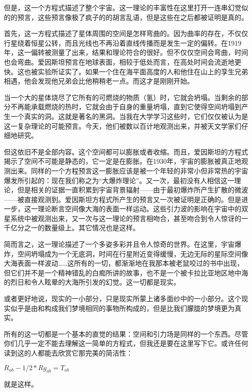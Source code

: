    但是，这一个方程式描述了整个宇宙。这一理论的丰富性在这里打开一连串幻觉似的的预言，这些预言像极了疯子的的胡言乱语，但是这些在之后都被证明是真的。

   首先，这一方程式描述了星体周围的空间是怎样弯曲的。因为曲率的存在，不仅仅行星绕着恒星公转，而且光线也不再沿着直线传播而是发生一定的偏转。在1919年，这一偏转被测量了出来，结果和理论符合的很好。但不仅仅空间会弯曲，时间也会弯曲。爱因斯坦预言在地球表面，相较于低处而言，在高处时间会流逝地更快。这也被实验所证实了。如果一个住在海平面高度的人和他住在山上的孪生兄弟相遇，他会发现他兄弟会比他稍稍老一点。而这才是刚刚开始。

   当一个大的星体烧尽了它所有的可燃烧的物质（氢）时，它就会坍塌。当剩余的部分不再能承载燃烧的热时，它就会由于自身的重量坍塌，直到它使得空间坍塌到产生一个真实的洞。这就是著名的黑洞。当我在大学学习这些时，它们仅仅被认为是这一复杂理论的可能预言。今天，他们被数以百计地观测出来，并被天文学家们仔细地研究。

   但这依旧不是全部内容。这个空间都可以膨胀或者收缩。而且，爱因斯坦的方程式揭示了空间不可能是静态的，它一定是在膨胀。在1930年，宇宙的膨胀被真正地观测出来。同样的一个方程预言这一膨胀应该是被一个年轻的非常小但非常热的宇宙爆发所引起的：现在我们称之为“大爆炸理论”。又一次，最初没有人相信这一理论，但是相关的证据一直积累到宇宙背景辐射——由于最初爆炸所产生扩散的微波——被直接观测到。爱因斯坦方程式所产生的预言又一次被证明是正确的。但是进一步，这一理论断言空间像大海的表面一样运动。这些引力波的影响在宇宙中的双星系统中被观测出来，又一次与这一理论的预言相吻合，甚至吻合到令人惊讶的一千亿分之一的数量级上。其它情况也是这样。

   简而言之，这一理论描述了一个多姿多彩并且令人惊奇的世界。在这里，宇宙爆炸，空间坍塌成为一个无底洞，时间在行星附近变得缓慢，无边无际的星际空间像大海表面一样波动……这所有的一切，都渐渐地在我那本被老鼠咬过的书中出现，但它们并不是一个精神错乱的白痴所讲的故事，也不是一个被卡拉比亚地区地中海的烈日和令人眩晕的大海所引发的幻觉。这一切都是现实。

   或者更好地说，现实的一小部分，只是现实所蒙上诸多面纱中的一小部分。这个现实似乎是由和构成我们梦境相同的事物所构成的，但是比我们朦胧的梦境更为真实。

   所有的这一切都是一个基本的直觉的结果：空间和引力场是同样的一个东西。尽管你们几乎一定不能去理解这一简单的方程式，但我还是要在这里写下它。或许任何读到这的人都能去欣赏它那完美的简洁性：

                                            $R_{ab}-1/2*Rg_{ab}=T_{ab}$

   就是这样。


